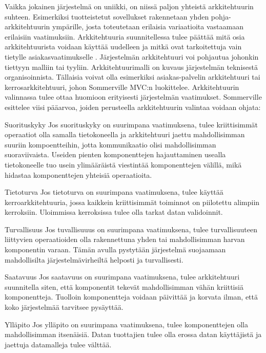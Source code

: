 \documentclass[utf8]{gradu3}
\begin{document}
Vaikka jokainen järjestelmä on uniikki, on niissä paljon yhteistä arkkitehtuurin suhteen. Esimerkiksi tuotteistetut sovellukset rakennetaan yhden pohja-arkkitehtuurin ympärille, josta toteutetaan erilaisia variaatioita vastaamaan erilaisiin vaatimuksiin. Arkkitehtuuria suunnitellessa tulee päättää mitä osia arkkitehtuurista voidaan käyttää uudelleen ja mitkä ovat tarkoitettuja vain tietylle asiakasvaatimukselle \parencite[s. 151]{Sommerville}. Järjestelmän arkkitehtuuri voi pohjautua johonkin tiettyyn malliin tai tyyliin. Arkkitehtuurimalli on kuvaus järjestelmän teknisestä organisoinnista. Tällaisia voivat olla esimerkiksi asiakas-palvelin arkkitehtuuri tai kerrosarkkitehtuuri, johon Sommerville MVC:n luokittelee. Arkkitehtuurin valinnassa tulee ottaa huomioon erityisesti järjestelmän vaatimukset. Sommerville \parencite[s.152]{Sommerville} esittelee viisi pääarvoa, joiden perusteella arkkitehtuurin valintaa voidaan ohjata:

\begin{desclist}
\item[Suorituskyky] Jos suorituskyky on suurimpana vaatimuksena, tulee kriittisimmät operaatiot olla samalla tietokoneella ja arkkitehtuuri jaettu mahdollisimman suuriin kompoentteihin, jotta kommunikaatio olisi mahdollisimman suoraviivaista. Useiden pienten komponenttejen hajauttaminen usealla tietokoneelle tuo usein ylimääräistä viestintää komponenttejen välillä, mikä hidastaa komponenttejen yhteisiä operaatioita. 
\item[Tietoturva] Jos tietoturva on suurimpana vaatimuksena, tulee käyttää kerroarkkitehtuuria, jossa kaikkein kriittisimmät toiminnot on piilotettu alimpiin kerroksiin. Uloimmissa kerroksissa tulee olla tarkat datan validoinnit. 
\item[Turvallisuus] Jos tuvallisuuus on suurimpana vaatimuksena, tulee turvallisuuteen liittyvien operaatioiden olla rakennettuna yhden tai mahdollisimman harvan komponentin varaan. Tämän avulla pystytään järjestelmä suojaamaan mahdollisilta järjestelmävirheiltä helposti ja turvallisesti.
\item[Saatavuus] Jos saatavuus on suurimpana vaatimuksena, tulee arkkitehtuuri suunnitella siten, että komponentit tekevät mahdollisimman vähän kriittisiä komponentteja. Tuolloin komponentteja voidaan päivittää ja korvata ilman, että koko järjestelmää tarvitsee pysäyttää. 
\item[Ylläpito] Jos ylläpito on suurimpana vaatimuksena, tulee komponenttejen olla mahdollisimman itsenäisiä. Datan tuottajien tulee olla erossa datan käyttäjistä ja jaettuja datamalleja tulee välttää.
\end{desclist}
\end{document}
